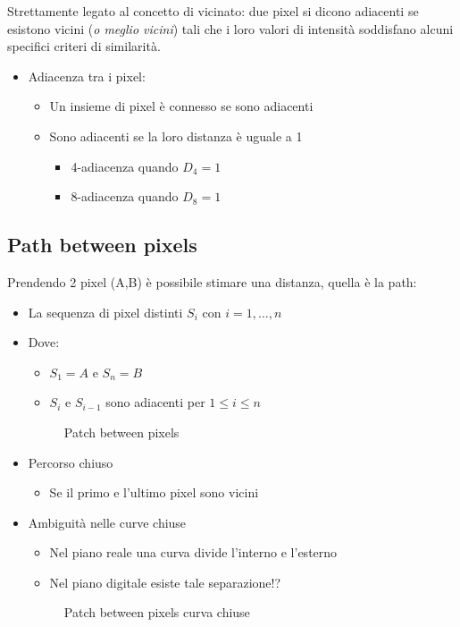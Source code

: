 \documentclass{report}
\begin{document}
Strettamente legato al concetto di vicinato: due pixel si dicono
adiacenti se esistono vicini (\emph{o meglio vicini}) tali che i loro
valori di intensità soddisfano alcuni specifici criteri di similarità.
\begin{itemize}
\item Adiacenza tra i pixel:
  \begin{itemize}
  \item Un insieme di pixel è connesso se sono adiacenti
  \item Sono adiacenti se la loro distanza è uguale a 1
    \begin{itemize}
    \item 4-adiacenza quando $D_4 = 1$
    \item 8-adiacenza quando $D_8 = 1$
    \end{itemize}
  \end{itemize}
\end{itemize}

\subsection{Path between pixels}
\label{sec:pathbetpixels}

Prendendo 2 pixel (A,B) è possibile stimare una distanza, quella è la
path:
\begin{itemize}
\item La sequenza di pixel distinti $S_i$ con $i =1,\dots,n$
\item Dove:
  \begin{itemize}
  \item $S_1 = A$ e $S_n = B$
  \item $S_i$ e $S_{i-1}$ sono adiacenti per $1\leq i\leq n$
  \end{itemize}
  \begin{figure}[ht!]
    \centering
    \resizebox{8cm}{!}{
    }
    \caption{Patch between pixels}
    \label{fig:pathpix}
  \end{figure}
\item Percorso chiuso
  \begin{itemize}
  \item Se il primo e l'ultimo pixel sono vicini
  \end{itemize}
\item Ambiguità nelle curve chiuse
  \begin{itemize}
  \item Nel piano reale una curva divide l'interno e l'esterno
  \item Nel piano digitale esiste tale separazione!?
  \end{itemize}
  \begin{figure}[ht!]
    \centering
    \resizebox{8cm}{!}{
    }
    \caption{Patch between pixels curva chiuse}
    \label{fig:pathpix2}
  \end{figure}
\end{itemize}
\end{document}
